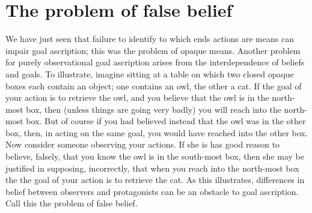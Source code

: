 \documentclass[12pt,a4paper]{extarticle}
\begin{document}
\section{The problem of false belief}
We have just seen that 
failure to identify to which ends actions are means can impair goal ascription; this was the problem of opaque means.
Another problem for purely observational goal ascription arises from the interdependence of beliefs and goals.
To illustrate, 
imagine sitting at a table on which two closed opaque boxes each contain an object; one contains an owl, the other a cat.
If the goal of your action is to retrieve the owl, 
and you believe that the owl is in the north-most box,
then 
(unless things are going very badly) 
you will reach into the north-most box.
But of course if you had believed instead that the owl was in the other box,
then, in acting on the same goal, you would have reached into the other box.
Now consider someone observing your actions.
If she is has good reason to believe, falsely, that you know the owl is in the south-most box,
then she may be justified in supposing, incorrectly, that when you reach into the north-most box the the goal of your action is to retrieve the cat.
As this illustrates,
differences in belief between observers and protagonists can be an obstacle to goal ascription.
Call this the problem of false belief.
\end{document}
